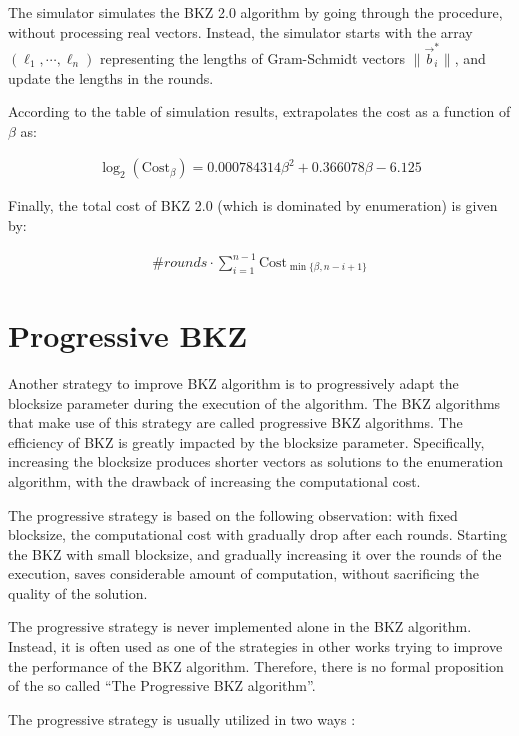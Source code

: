 \documentclass[11pt]{article}
\newcommand{\vb}{\vec{b}}
\newcommand{\Costbeta}{\mathrm{Cost}_{\beta}}
\begin{document}
The simulator simulates the BKZ 2.0 algorithm by going through the procedure, without processing real vectors.
Instead, the simulator starts with the array $(\ell_1,\cdots,\ell_n)$ representing the lengths of Gram-Schmidt vectors $\|\vb_i^*\|$, and update the lengths in the rounds.

According to the table of simulation results, \cite{awht2016improved} extrapolates the cost as a function of $\beta$ as:

\begin{eqnarray}
\log_2(\Costbeta) = 0.000784314\beta^2 + 0.366078\beta - 6.125
\end{eqnarray}

Finally, the total cost of BKZ 2.0 (which is dominated by enumeration) is given by:

\begin{eqnarray}
\#rounds\cdot\sum_{i=1}^{n-1}\mathrm{Cost}_{\min\{\beta,n-i+1\}}
\end{eqnarray}


\section{Progressive BKZ}
\label{sec:pbkz}

Another strategy to improve BKZ algorithm is to progressively adapt the blocksize parameter during the execution of the algorithm.
The BKZ algorithms that make use of this strategy are called progressive BKZ algorithms.
The efficiency of BKZ is greatly impacted by the blocksize parameter.
Specifically, increasing the blocksize produces shorter vectors as solutions to the enumeration algorithm, with the drawback of increasing the computational cost.

The progressive strategy is based on the following observation: with fixed blocksize, the computational cost with gradually drop after each rounds.
Starting the BKZ with small blocksize, and gradually increasing it over the rounds of the execution, saves considerable amount of computation, without sacrificing the quality of the solution.

The progressive strategy is never implemented alone in the BKZ algorithm.
Instead, it is often used as one of the strategies in other works trying to improve the performance of the BKZ algorithm.
Therefore, there is no formal proposition of the so called ``The Progressive BKZ algorithm''.

The progressive strategy is usually utilized in two ways \cite{hr2019analyzing}:
\end{document}
